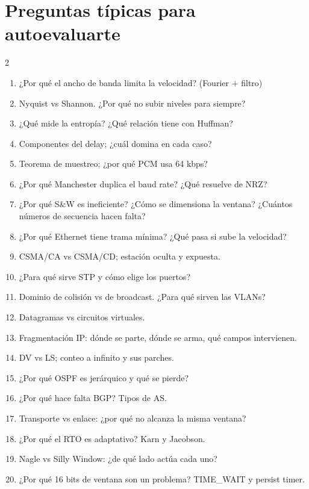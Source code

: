 \documentclass[10pt,a4paper]{article}
\begin{document}
\section*{Preguntas típicas para autoevaluarte}
\begin{multicols}{2}\small
\begin{enumerate}[leftmargin=14pt]
  \item ¿Por qué el ancho de banda limita la velocidad? (Fourier $+$ filtro)
  \item Nyquist vs Shannon. ¿Por qué no subir niveles para siempre?
  \item ¿Qué mide la entropía? ¿Qué relación tiene con Huffman?
  \item Componentes del delay; ¿cuál domina en cada caso?
  \item Teorema de muestreo; ¿por qué PCM usa 64 kbps?
  \item ¿Por qué Manchester duplica el baud rate? ¿Qué resuelve de NRZ?
  \item ¿Por qué S\&W es ineficiente? ¿Cómo se dimensiona la ventana? ¿Cuántos números de secuencia hacen falta?
  \item ¿Por qué Ethernet tiene trama mínima? ¿Qué pasa si sube la velocidad?
  \item CSMA/CA vs CSMA/CD; estación oculta y expuesta.
  \item ¿Para qué sirve STP y cómo elige los puertos?
  \item Dominio de colisión vs de broadcast. ¿Para qué sirven las VLANs?
  \item Datagramas vs circuitos virtuales.
  \item Fragmentación IP: dónde se parte, dónde se arma, qué campos intervienen.
  \item DV vs LS; conteo a infinito y sus parches.
  \item ¿Por qué OSPF es jerárquico y qué se pierde?
  \item ¿Por qué hace falta BGP? Tipos de AS.
  \item Transporte vs enlace: ¿por qué no alcanza la misma ventana?
  \item ¿Por qué el RTO es adaptativo? Karn y Jacobson.
  \item Nagle vs Silly Window: ¿de qué lado actúa cada uno?
  \item ¿Por qué 16 bits de ventana son un problema? TIME\_WAIT y persist timer.
\end{enumerate}
\end{multicols}
\end{document}
